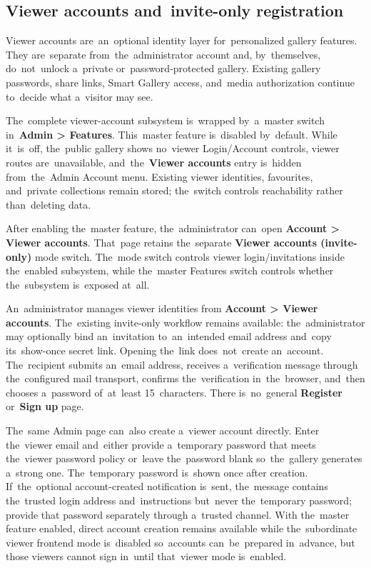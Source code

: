 \documentclass[11pt,a4paper]{article}
\newcommand{\ui}[1]{\textbf{#1}}
\begin{document}
\subsection{Viewer accounts and~invite-only registration}

Viewer accounts are~an~optional identity layer for~personalized gallery
features. They are~separate from~the~administrator account and, by~themselves,
do~not~unlock a~private or~password-protected gallery. Existing gallery
passwords, share links, Smart Gallery access, and~media authorization continue
to~decide what a~visitor may see.

The~complete viewer-account subsystem is~wrapped by~a~master switch
in~\ui{Admin > Features}. This~master feature is~disabled by~default. While
it~is~off, the~public gallery shows no~viewer Login/Account controls, viewer
routes are~unavailable, and~the~\ui{Viewer accounts} entry is~hidden
from~the~Admin Account menu. Existing viewer identities, favourites, and~private
collections remain stored; the~switch controls reachability rather than~deleting
data.

After enabling the~master feature, the~administrator can~open \ui{Account >
Viewer accounts}. That~page retains the~separate \ui{Viewer accounts
(invite-only)} mode switch. The~mode switch controls viewer login/invitations
inside the~enabled subsystem, while the~master Features switch controls whether
the~subsystem is~exposed at~all.

An~administrator manages viewer identities from \ui{Account > Viewer accounts}.
The~existing invite-only workflow remains available: the~administrator may
optionally bind an~invitation to~an~intended email address and~copy
its~show-once secret link. Opening the~link does~not~create an~account.
The~recipient submits an~email address, receives a~verification message through
the~configured mail transport, confirms the~verification in~the~browser,
and~then chooses a~password of~at~least 15~characters. There is~no~general
\ui{Register} or~\ui{Sign up} page.

The~same Admin page can~also create a~viewer account directly. Enter the~viewer
email and~either provide a~temporary password that meets the~viewer password
policy or~leave the~password blank so~the~gallery generates a~strong one.
The~temporary password is~shown once after creation. If~the~optional
account-created notification is~sent, the~message contains the~trusted login
address and~instructions but~never the~temporary password; provide that password
separately through a~trusted channel. With the~master feature enabled, direct
account creation remains available while the~subordinate viewer frontend mode
is~disabled so~accounts can~be~prepared in~advance, but those viewers cannot
sign in~until that~viewer mode is~enabled.
\end{document}
